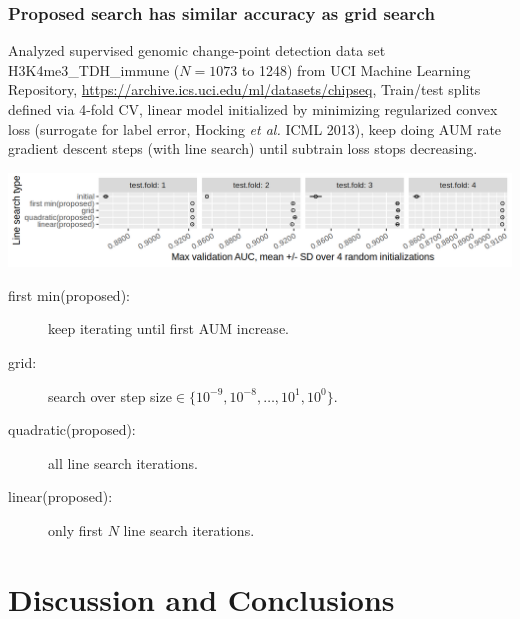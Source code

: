 \documentclass[t]{beamer}
\begin{document}
\begin{frame}
  \frametitle{Proposed search has similar accuracy as grid search}

  Analyzed supervised genomic change-point detection data set
  H3K4me3\_TDH\_immune ($N=1073$ to 1248)
  from UCI Machine Learning Repository,
  {\scriptsize \url{https://archive.ics.uci.edu/ml/datasets/chipseq},}
  Train/test splits defined via 4-fold CV, linear model initialized by
  minimizing regularized convex loss (surrogate for label error,
  Hocking \emph{et al.} ICML 2013), keep doing AUM rate gradient
  descent steps (with line search) until subtrain loss stops decreasing.

  \includegraphics[width=\textwidth]{figure-line-search-complexity-compare-H3K4me3_TDH_immune-equal_labels-rate-IntervalRegressionCV-initial}

  \begin{description}
  \item[first min(proposed):] keep iterating until first AUM
    increase.
  \item[grid:] search over step
    size$\in\{10^{-9},10^{-8},\dots,10^1,10^0\}$.
  \item[quadratic(proposed):] all line search iterations.
  \item[linear(proposed):] only first $N$ line search iterations.
  \end{description}
\end{frame}


\section{Discussion and Conclusions}
\end{document}

